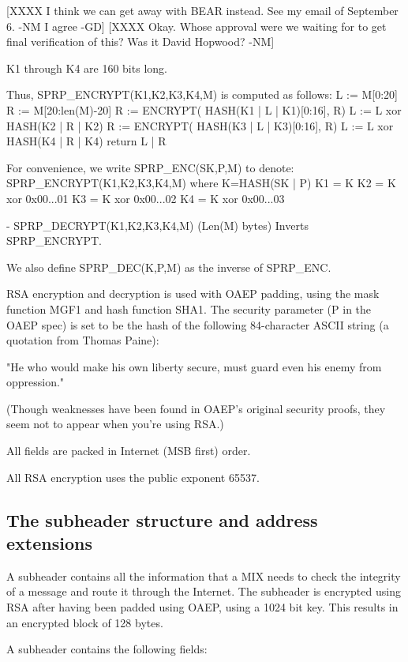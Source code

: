   [XXXX I think we can get away with BEAR instead.  See my email of
    September 6. -NM I agree -GD]
  [XXXX Okay.  Whose approval were we waiting for to get final
    verification of this?  Was it David Hopwood? -NM]

  K1 through K4 are 160 bits long.

  Thus, SPRP_ENCRYPT(K1,K2,K3,K4,M) is computed as follows:
            L := M[0:20]
            R := M[20:len(M)-20]
            R := ENCRYPT( HASH(K1 | L | K1)[0:16], R)
            L := L xor HASH(K2 | R | K2)
            R := ENCRYPT( HASH(K3 | L | K3)[0:16], R)
            L := L xor HASH(K4 | R | K4) 
            return L | R

  For convenience, we write SPRP_ENC(SK,P,M) to denote:
       SPRP_ENCRYPT(K1,K2,K3,K4,M)
       where K=HASH(SK | P)
             K1 = K
             K2 = K xor 0x00...01
             K3 = K xor 0x00...02
             K4 = K xor 0x00...03

- SPRP_DECRYPT(K1,K2,K3,K4,M) (Len(M) bytes) Inverts SPRP_ENCRYPT.

  We also define SPRP_DEC(K,P,M) as the inverse of SPRP_ENC.

RSA encryption and decryption is used with OAEP padding, using the
mask function MGF1 and hash function SHA1.  The security parameter (P
in the OAEP spec) is set to be the hash of the following 84-character
ASCII string (a quotation from Thomas Paine):

     "He who would make his own liberty secure, must guard even his
      enemy from oppression." 

(Though weaknesses have been found in OAEP's original security proofs,
they seem not to appear when you're using RSA.)

All fields are packed in Internet (MSB first) order.

All RSA encryption uses the public exponent 65537.

\subsection{The subheader structure and address extensions}

A subheader contains all the information that a MIX needs to check the
integrity of a message and route it through the Internet. The subheader
is encrypted using RSA after having been padded using OAEP, using a 1024
bit key. This results in an encrypted block of 128 bytes.

A subheader contains the following fields:

